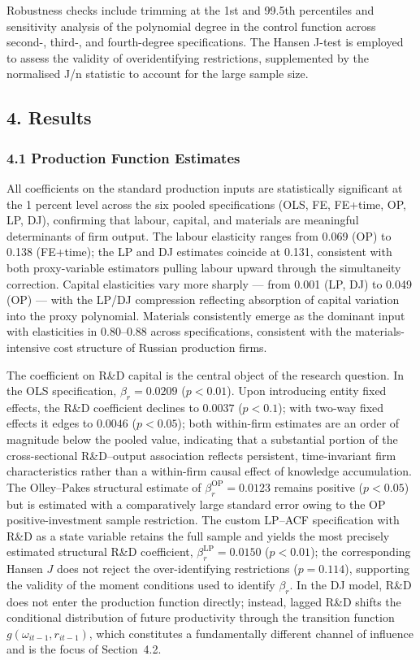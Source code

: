 \documentclass[a4paper, 12pt]{article}
\begin{document}
Robustness checks include trimming at the 1st and 99.5th percentiles and sensitivity analysis of the polynomial degree in the control function across second-, third-, and fourth-degree specifications. The Hansen J-test is employed to assess the validity of overidentifying restrictions, supplemented by the normalised J/n statistic to account for the large sample size.

\subsection{4. Results}

\subsubsection{4.1 Production Function Estimates}

All coefficients on the standard production inputs are statistically significant at the 1 percent level across the six pooled specifications (OLS, FE, FE+time, OP, LP, DJ), confirming that labour, capital, and materials are meaningful determinants of firm output. The labour elasticity ranges from 0.069 (OP) to 0.138 (FE+time); the LP and DJ estimates coincide at 0.131, consistent with both proxy-variable estimators pulling labour upward through the simultaneity correction. Capital elasticities vary more sharply --- from 0.001 (LP, DJ) to 0.049 (OP) --- with the LP/DJ compression reflecting absorption of capital variation into the proxy polynomial. Materials consistently emerge as the dominant input with elasticities in $0.80$--$0.88$ across specifications, consistent with the materials-intensive cost structure of Russian production firms.

The coefficient on R\&D capital is the central object of the research question. In the OLS specification, $\beta_r = 0.0209$ ($p < 0.01$). Upon introducing entity fixed effects, the R\&D coefficient declines to $0.0037$ ($p < 0.1$); with two-way fixed effects it edges to $0.0046$ ($p < 0.05$); both within-firm estimates are an order of magnitude below the pooled value, indicating that a substantial portion of the cross-sectional R\&D--output association reflects persistent, time-invariant firm characteristics rather than a within-firm causal effect of knowledge accumulation. The Olley--Pakes structural estimate of $\beta_r^{\text{OP}} = 0.0123$ remains positive ($p < 0.05$) but is estimated with a comparatively large standard error owing to the OP positive-investment sample restriction. The custom LP--ACF specification with R\&D as a state variable retains the full sample and yields the most precisely estimated structural R\&D coefficient, $\beta_r^{\text{LP}} = 0.0150$ ($p < 0.01$); the corresponding Hansen $J$ does not reject the over-identifying restrictions ($p = 0.114$), supporting the validity of the moment conditions used to identify $\beta_r$. In the DJ model, R\&D does not enter the production function directly; instead, lagged R\&D shifts the conditional distribution of future productivity through the transition function $g(\omega_{it-1}, r_{it-1})$, which constitutes a fundamentally different channel of influence and is the focus of Section~4.2.
\end{document}
